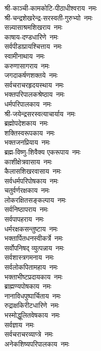 \begin{flushleft}
\begin{multicols}{2}
श्री-काञ्ची-कामकोटि-पीठाधीश्वराय~नमः\\
श्री-चन्द्रशेखरेन्द्र-सरस्वती-गुरुभ्यो~नमः\\
सन्न्यासाश्रमशिखराय~नमः\\
काषाय-दण्डधारिणे~नमः\\
सर्वपीडाप्रायश्चित्ताय~नमः\\
स्वामीनाथाय~नमः\\
करुणासागराय~नमः\\
जगदाकर्षणशक्तये~नमः\\
सर्वचराचरहृदयस्थाय~नमः\\
भक्तपरिपालकश्रेष्ठाय~नमः\hfill{}\\
धर्मपरिपालकाय~नमः\\
श्री-जयेन्द्रसरस्वत्याचार्याय~नमः\\
ब्रह्मोपदेशकाय~नमः\\
शक्तिस्वरूपकाय~नमः\\
भक्तजनप्रियाय~नमः\\
ब्रह्म-विष्णु-शिवैक्य एकरूपाय~नमः\\
काशीक्षेत्रवासाय~नमः\\
कैलासशिखरवासाय~नमः\\
सर्वधर्मपरिपोषकाय~नमः\\
चतुर्वर्णरक्षकाय~नमः\hfill{}\\
लोकरक्षितसङ्कल्पाय~नमः\\
सर्वनिष्ठापराय~नमः\\
सर्वपापहराय~नमः\\
धर्मरक्षकसन्तुष्टाय~नमः\\
भक्तार्पितधनस्वीकर्त्रे~नमः\\
सर्वोपनिषद् व्युत्पन्नाय~नमः\\
सर्वशास्त्रगमनाय~नमः\\
सर्वलोकपितामहाय~नमः\\
भक्ताभीष्टप्रदायकाय~नमः\\
ब्राह्मण्यपोषकाय~नमः\hfill{}\\
नानाविधपुष्पार्चिताय~नमः\\
रुद्राक्षकिरीटधारिणे~नमः\\
भस्मोद्धूलितवेषकाय~नमः\\
सर्वज्ञाय~नमः\\
सर्वचराचरव्याप्त्रे~नमः\\
अनेकशिष्यपरिपालकाय~नमः\\

\end{multicols}
\end{flushleft}
